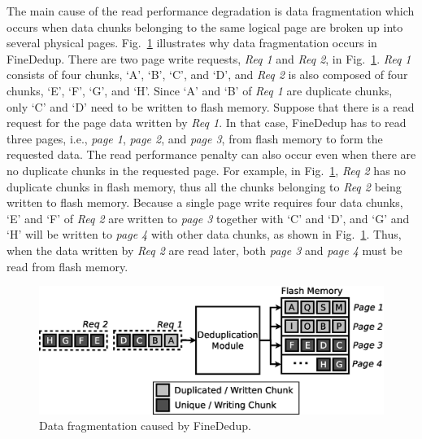 The main cause of the read performance degradation is data fragmentation
which occurs when data chunks belonging to the same logical page are broken up into several physical pages.
Fig.~\ref{fig:readoverhead} illustrates why data fragmentation occurs in FineDedup.
There are two page write requests, \textit{Req 1} and \textit{Req 2}, in Fig.~\ref{fig:readoverhead}.
\textit{Req 1} consists of four chunks, `A', `B', `C', and `D', 
and \textit{Req 2} is also composed of four chunks, `E', `F', `G', and `H'.
Since `A' and `B' of \textit{Req 1} are duplicate chunks,
only `C' and `D' need to be written to flash memory.
Suppose that there is a read request for the page data written by \textit{Req 1}.
In that case, FineDedup has to read three pages, i.e., \textit{page 1}, \textit{page 2}, and \textit{page 3}, from flash memory
to form the requested data.
The read performance penalty can also occur even when there are no duplicate chunks in the requested page.
For example, in Fig.~\ref{fig:readoverhead}, 
\textit{Req 2} has no duplicate chunks in flash memory,
thus all the chunks belonging to \textit{Req 2} being written to flash memory.
Because a single page write requires four data chunks, 
`E' and `F' of \textit{Req 2} are written to \textit{page 3} together with `C' and `D',
and `G' and `H' will be written to \textit{page 4} with other data chunks, as shown in Fig.~\ref{fig:readoverhead}.
Thus, when the data written by \textit{Req 2} are read later, 
both \textit{page 3} and \textit{page 4} must be read from flash memory.

\begin{figure}[t]
	\center
	\includegraphics[scale=0.4]{figure/finededup/readoverhead}
	\caption{Data fragmentation caused by FineDedup.} %
	\label{fig:readoverhead}
\end{figure}


